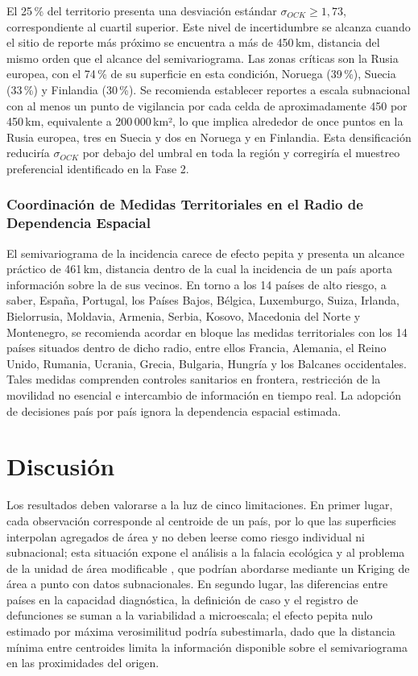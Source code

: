 \documentclass[12pt,a4paper]{article}
\begin{document}
El 25\,\% del territorio presenta una desviación estándar $\sigma_{OCK}\ge1{,}73$, correspondiente al cuartil superior. Este nivel de incertidumbre se alcanza cuando el sitio de reporte más próximo se encuentra a más de 450\,km, distancia del mismo orden que el alcance del semivariograma. Las zonas críticas son la Rusia europea, con el 74\,\% de su superficie en esta condición, Noruega (39\,\%), Suecia (33\,\%) y Finlandia (30\,\%). Se recomienda establecer reportes a escala subnacional con al menos un punto de vigilancia por cada celda de aproximadamente 450 por 450\,km, equivalente a 200\,000\,km², lo que implica alrededor de once puntos en la Rusia europea, tres en Suecia y dos en Noruega y en Finlandia. Esta densificación reduciría $\sigma_{OCK}$ por debajo del umbral en toda la región y corregiría el muestreo preferencial identificado en la Fase 2.

\subsubsection{Coordinación de Medidas Territoriales en el Radio de Dependencia Espacial}

El semivariograma de la incidencia carece de efecto pepita y presenta un alcance práctico de 461\,km, distancia dentro de la cual la incidencia de un país aporta información sobre la de sus vecinos. En torno a los 14 países de alto riesgo, a saber, España, Portugal, los Países Bajos, Bélgica, Luxemburgo, Suiza, Irlanda, Bielorrusia, Moldavia, Armenia, Serbia, Kosovo, Macedonia del Norte y Montenegro, se recomienda acordar en bloque las medidas territoriales con los 14 países situados dentro de dicho radio, entre ellos Francia, Alemania, el Reino Unido, Rumania, Ucrania, Grecia, Bulgaria, Hungría y los Balcanes occidentales. Tales medidas comprenden controles sanitarios en frontera, restricción de la movilidad no esencial e intercambio de información en tiempo real. La adopción de decisiones país por país ignora la dependencia espacial estimada.

\section{Discusión}

Los resultados deben valorarse a la luz de cinco limitaciones. En primer lugar, cada observación corresponde al centroide de un país, por lo que las superficies interpolan agregados de área y no deben leerse como riesgo individual ni subnacional; esta situación expone el análisis a la falacia ecológica y al problema de la unidad de área modificable \citep{openshaw1984,gotway2002}, que podrían abordarse mediante un Kriging de área a punto con datos subnacionales. En segundo lugar, las diferencias entre países en la capacidad diagnóstica, la definición de caso y el registro de defunciones se suman a la variabilidad a microescala; el efecto pepita nulo estimado por máxima verosimilitud podría subestimarla, dado que la distancia mínima entre centroides limita la información disponible sobre el semivariograma en las proximidades del origen.
\end{document}
